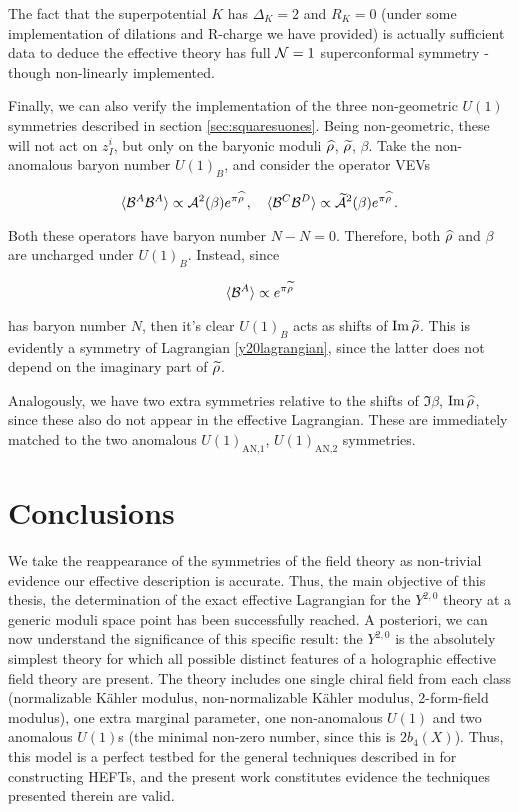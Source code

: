 The fact that the superpotential $K$ has $\Delta_K = 2$ and $R_K = 0$ (under some implementation of dilations and R-charge we have provided) is actually sufficient data \cite{terningmodernsusy} to deduce the effective theory has full $\mathcal{N} = 1$ superconformal symmetry - though non-linearly implemented.

Finally, we can also verify the implementation of the three non-geometric $U(1)$ symmetries described in section \ref{sec:squaresuones}. Being non-geometric, these will not act on $z_I^i$, but only on the baryonic moduli $\widehat{\rho}$, $\widetilde{\rho}$, $\beta$. Take the non-anomalous baryon number $U(1)_B$, and consider the operator VEVs

\begin{equation}
	\langle\mathcal{B}^A \mathcal{B}^A\rangle \propto \mathcal{A}^2(\beta) e^{\pi\widehat{\rho}}\,,\quad 
	\langle{\ensuremath{\mathcal{B}}^C\ensuremath{\mathcal{B}}^D}\rangle \propto \widetilde{\mathcal{A}}^2(\beta) e^{\pi\widehat{\rho}}\,.
	\label{}
\end{equation}

Both these operators have baryon number $N-N=0$. Therefore, both $\widehat{\rho}$ and $\beta$ are uncharged under $U(1)_B$. Instead, since

\begin{equation}
	\langle \mathcal{B}^A \rangle \propto e^{\pi\widetilde{\rho}}
	\label{}
\end{equation}

has baryon number $N$, then it's clear $U(1)_B$ acts as shifts of $\operatorname{Im} \widetilde{\rho}$. This is evidently a symmetry of Lagrangian \eqref{y20lagrangian}, since the latter does not depend on the imaginary part of $\widetilde{\rho}$.

Analogously, we have two extra symmetries relative to the shifts of $\Im \beta$, $\operatorname{Im} \widehat{\rho}$, since these also do not appear in the effective Lagrangian. These are immediately matched to the two anomalous $U(1)_\text{AN,1}$, $U(1)_\text{AN,2}$ symmetries.

\section{Conclusions}

We take the reappearance of the symmetries of the field theory as non-trivial evidence our effective description is accurate. Thus, the main objective of this thesis, the determination of the exact effective Lagrangian for the $Y^{2,0}$ theory at a generic moduli space point has been successfully reached. A posteriori, we can now understand the significance of this specific result: the $Y^{2,0}$ is the absolutely simplest theory for which all possible distinct features of a holographic effective field theory are present. The theory includes one single chiral field from each class (normalizable K\"ahler modulus, non-normalizable K\"ahler modulus, 2-form-field modulus), one extra marginal parameter, one non-anomalous $U(1)$ and two anomalous $U(1)$s (the minimal non-zero number, since this is $2b_4(X)$). Thus, this model is a perfect testbed for the general techniques described in \cite{MZ} for constructing HEFTs, and the present work constitutes evidence the techniques presented therein are valid.

